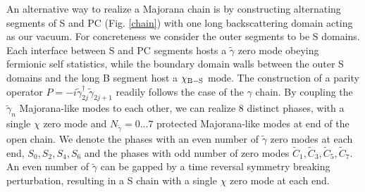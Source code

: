 \documentclass[twocolumn,aps,prb,showpacs]{revtex4-1}
\begin{document}
An alternative way to realize a  Majorana chain is by constructing alternating segments of S and PC (Fig. \ref{chain}) with one long backscattering domain acting as our vacuum.
For concreteness we consider the outer segments to be S domains. Each interface between  S and PC segments  hosts a $\tilde{\gamma} $ zero mode
obeying fermionic self statistics, while the boundary domain walls between the outer S domains and the long B segment host a $ \chi_{\rm B-S}$
 mode.  The construction of a parity operator
 $ P = -i\tilde{\gamma}_{2j}^\dag\tilde{\gamma}_{2j+1}$
 readily follows the case of the $\gamma $ chain. By coupling the $\tilde{\gamma}_n$  Majorana-like modes to each other, we can realize 8 distinct phases, with a single $\chi $ zero mode and $N_{\tilde{\gamma}} = 0...7$ protected  Majorana-like modes at end of the open chain. We denote the phases with an even number of $\tilde{\gamma}$ zero modes at each end, $S_0,S_2,S_4,S_6 $ and the phases with odd number of zero modes $\tilde{C}_1,\tilde{C}_3,\tilde{C}_5,\tilde{C}_7 $.
 An even number of $ \tilde{\gamma}$ can be gapped by a time reversal symmetry breaking perturbation, resulting in a S chain with a single $\chi $ zero mode at each end.
\end{document}
